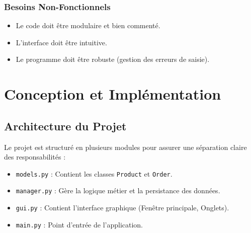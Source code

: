 \documentclass[12pt,a4paper]{report}
\begin{document}
\subsection{Besoins Non-Fonctionnels}
\begin{itemize}
    \item Le code doit être modulaire et bien commenté.
    \item L'interface doit être intuitive.
    \item Le programme doit être robuste (gestion des erreurs de saisie).
\end{itemize}

\chapter{Conception et Implémentation}
\section{Architecture du Projet}
Le projet est structuré en plusieurs modules pour assurer une séparation claire des responsabilités :
\begin{itemize}
    \item \texttt{models.py} : Contient les classes \texttt{Product} et \texttt{Order}.
    \item \texttt{manager.py} : Gère la logique métier et la persistance des données.
    \item \texttt{gui.py} : Contient l'interface graphique (Fenêtre principale, Onglets).
    \item \texttt{main.py} : Point d'entrée de l'application.
\end{itemize}
\end{document}
